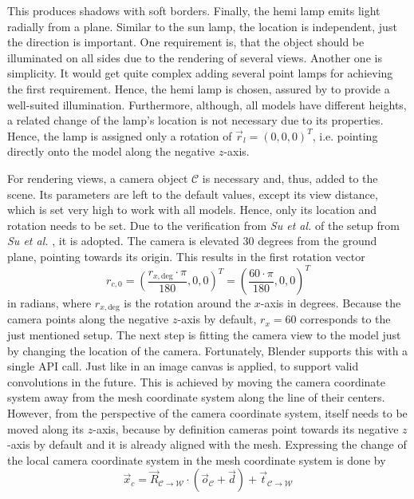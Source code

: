 This produces shadows with soft borders.
Finally, the hemi lamp emits light radially from a plane.
Similar to the sun lamp, the location is independent, just the direction is important.
One requirement is, that the object should be illuminated on all sides due to the rendering of several views.
Another one is simplicity.
It would get quite complex adding several point lamps for achieving the first requirement.
Hence, the hemi lamp is chosen, assured by  to provide a well-suited illumination.
Furthermore, although, all models have different heights, a related change of the lamp's location is not necessary due to its properties.
Hence, the lamp is assigned only a rotation of $\vec{r}_l = (0,0,0)^T$, i.e. pointing directly onto the model along the negative $z$-axis.

For rendering views, a camera object $\mathcal{C}$ is necessary and, thus, added to the scene.
Its parameters are left to the default values, except its view distance, which is set very high to work with all models.
Hence, only its location and rotation needs to be set.
Due to the verification from \textit{Su et al.} \cite{Su2018} of the setup from \textit{Su et al.} \cite{Su:2015:MCN:2919332.2919750}, it is adopted.
The camera is elevated 30 degrees from the ground plane, pointing towards its origin.
This results in the first rotation vector
\begin{equation}
	r_{c,0} = \left( \frac{r_{x,\text{deg}} \cdot \pi}{180}, 0, 0 \right)^T = \left( \frac{60 \cdot \pi}{180}, 0, 0 \right)^T
\end{equation}
in radians, where $r_{x,\text{deg}}$ is the rotation around the $x$-axis in degrees.
Because the camera points along the negative $z$-axis by default, $r_x = 60$ corresponds to the just mentioned setup.
The next step is fitting the camera view to the model just by changing the location of the camera.
Fortunately, Blender supports this with a single API call.
Just like in \cite{Su2018} an image canvas is applied, to support valid convolutions in the future.
This is achieved by moving the camera coordinate system away from the mesh coordinate system along the line of their centers.
However, from the perspective of the camera coordinate system, itself needs to be moved along its $z$-axis, because by definition cameras point towards its negative $z$-axis by default and it is already aligned with the mesh.
Expressing the change of the local camera coordinate system in the mesh coordinate system is done by
\begin{equation}
	\vec{x}_c = \vec{R}_{\mathcal{C} \rightarrow \mathcal{W}} \cdot (\vec{o}_{\mathcal{C}} + \vec{d}) + \vec{t}_{\mathcal{C} \rightarrow \mathcal{W}}
\end{equation}
